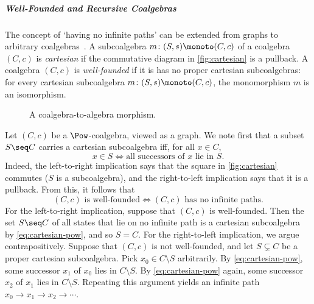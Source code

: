 \subparagraph*{Well-Founded and Recursive Coalgebras}\label{sec:prelim:wf-rec}
The concept of `having no infinite paths' can be extended from graphs to arbitrary coalgebras~\cite{taylor99}. A subcoalgebra $m\colon (S,s)\monoto (C,c)$ of a coalgebra $(C,c)$ is \emph{cartesian} if the commutative diagram in \autoref{fig:cartesian} is a pullback. A coalgebra $(C,c)$ is \emph{well-founded} if it is has no proper cartesian subcoalgebras: for every cartesian subcoalgebra $m\colon (S,s)\monoto (C,c)$, the monomorphism $m$ is an isomorphism.
\begin{figure}
  \begin{minipage}{.45\textwidth}\centering
  \caption{A cartesian subcoalgebra.}
  \label{fig:cartesian}
  \end{minipage}\hfill  \begin{minipage}{.5\textwidth}\centering
{}
  \caption{A coalgebra-to-algebra morphism.}
  \label{fig:coalg2alg}
  \end{minipage}
\end{figure}



\begin{example}[Graphs]\label{ex:wfCoalg}
Let $(C,c)$ be a $\Pow$-coalgebra, viewed as a graph. We note first that a subset $S\seq C$ carries a cartesian subcoalgebra iff, for all $x\in C$,
\begin{equation}\label{eq:cartesian-pow}
x\in S \iff \text{all successors of $x$ lie in $S$.}
\end{equation}
Indeed, the left-to-right implication says that the square in \autoref{fig:cartesian} commutes ($S$ is a subcoalgebra), and the right-to-left implication says that it is a pullback. From this, it follows that
\[ \text{$(C,c)$ is well-founded} \iff \text{$(C,c)$ has no infinite paths}. \]
 For the left-to-right implication, suppose that $(C,c)$ is well-founded. Then the set $S\seq C$ of all states that lie on no infinite path is a cartesian subcoalgebra by \eqref{eq:cartesian-pow}, and so $S=C$. For the right-to-left implication, we argue contrapositively. Suppose that $(C,c)$ is not well-founded, and let $S\subsetneq C$ be a proper cartesian subcoalgebra. Pick $x_0\in C\setminus S$ arbitrarily. By \eqref{eq:cartesian-pow}, some successor $x_1$ of $x_0$ lies in $C\setminus S$. By \eqref{eq:cartesian-pow} again, some successor $x_2$ of $x_1$ lies in $C\setminus S$. Repeating this argument yields an infinite path $x_0\to x_1\to x_2\to \cdots$.
\end{example}

